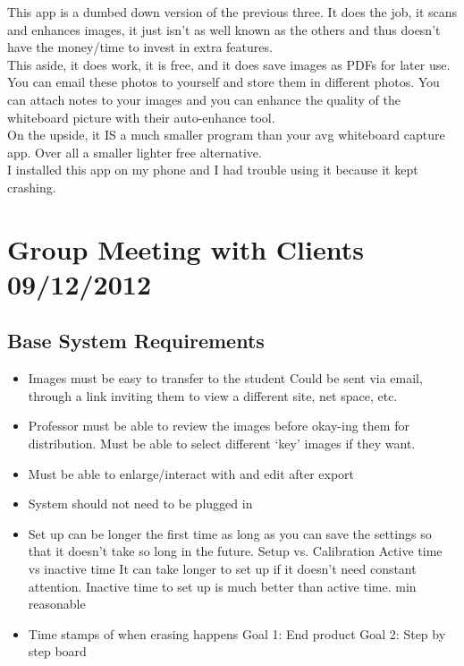 \documentclass[]{article}
\begin{document}
		This app is a dumbed down version of the previous three. It does the job, it scans and enhances images, it just isn’t as well known as the others and thus doesn’t have the money/time to invest in extra features.\\
		
		This aside, it does work, it is free, and it does save images as PDFs for later use. You can email these photos to yourself and store them in different photos. You can attach notes to your images and you can enhance the quality of the whiteboard picture with their auto-enhance tool.\\
		On the upside, it IS a much smaller program than your avg whiteboard capture app. Over all a smaller lighter free alternative.\\
		I installed this app on my phone and I had trouble using it because it kept crashing.\\

	
	\section{Group Meeting with Clients 09/12/2012}
		\subsection{Base System Requirements}
			\begin{itemize}
				\item Images must be easy to transfer to the student
					\subitem Could be sent via email, through a link inviting them to view a different site, net space, etc.
				\item Professor must be able to review the images before okay-ing them for distribution.
					\subitem Must be able to select different ‘key’ images if they want.
				\item Must be able to enlarge/interact with and edit after export
				\item System should not need to be plugged in
				\item Set up can be longer the first time as long as you can save the settings so that it doesn’t take so long in the future.
					\subitem Setup vs. Calibration
					\subitem Active time vs inactive time
						\subsubitem It can take longer to set up if it doesn’t need constant attention. Inactive time to set up is much better than active time.
					 min reasonable
				\item Time stamps of when erasing happens
					\subitem Goal 1: End product
					\subitem Goal 2: Step by step board
			\end{itemize}
	
\end{document}
